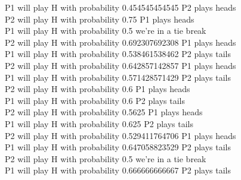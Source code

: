 \documentclass[11pt]{article}
\begin{document}
P1 will play H with probability 0.454545454545  P2 plays heads\\
P2 will play H with probability 0.75  P1 plays heads\\
P1 will play H with probability 0.5  we're in a tie break\\
P2 will play H with probability 0.692307692308  P1 plays heads\\
P1 will play H with probability 0.538461538462  P2 plays tails\\
P2 will play H with probability 0.642857142857  P1 plays heads\\
P1 will play H with probability 0.571428571429  P2 plays tails\\
P2 will play H with probability 0.6  P1 plays heads\\
P1 will play H with probability 0.6  P2 plays tails\\
P2 will play H with probability 0.5625  P1 plays heads\\
P1 will play H with probability 0.625  P2 plays tails\\
P2 will play H with probability 0.529411764706  P1 plays heads\\
P1 will play H with probability 0.647058823529  P2 plays tails\\
P2 will play H with probability 0.5  we're in a tie break\\
P1 will play H with probability 0.666666666667  P2 plays tails\\
\end{document}
